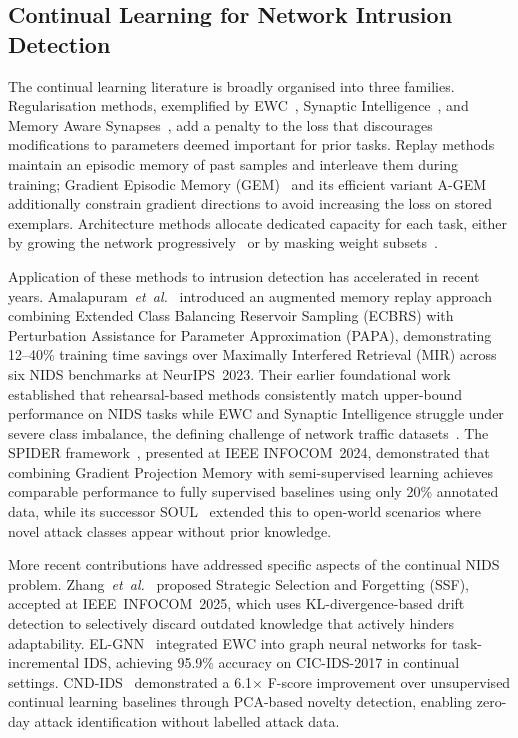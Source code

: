 \documentclass[journal]{IEEEtran}
\theoremstyle{definition}
\theoremstyle{remark}
\begin{document}
\subsection{Continual Learning for Network Intrusion Detection}
\label{subsec:cl_related}

The continual learning literature is broadly organised into three families. Regularisation methods, exemplified by EWC~\cite{kirkpatrick2017ewc}, Synaptic Intelligence~\cite{zenke2017continual}, and Memory Aware Synapses~\cite{aljundi2018memory}, add a penalty to the loss that discourages modifications to parameters deemed important for prior tasks. Replay methods maintain an episodic memory of past samples and interleave them during training; Gradient Episodic Memory (GEM)~\cite{lopezpaz2017gem} and its efficient variant A-GEM~\cite{chaudhry2019agem} additionally constrain gradient directions to avoid increasing the loss on stored exemplars. Architecture methods allocate dedicated capacity for each task, either by growing the network progressively~\cite{rusu2016progressive} or by masking weight subsets~\cite{serra2018overcoming}.

Application of these methods to intrusion detection has accelerated in recent years. Amalapuram~\textit{et~al.}~\cite{amalapuram2023augmented} introduced an augmented memory replay approach combining Extended Class Balancing Reservoir Sampling (ECBRS) with Perturbation Assistance for Parameter Approximation (PAPA), demonstrating 12--40\% training time savings over Maximally Interfered Retrieval (MIR) across six NIDS benchmarks at NeurIPS~2023. Their earlier foundational work established that rehearsal-based methods consistently match upper-bound performance on NIDS tasks while EWC and Synaptic Intelligence struggle under severe class imbalance, the defining challenge of network traffic datasets~\cite{amalapuram2022comsnets}. The SPIDER framework~\cite{amalapuram2024spider}, presented at IEEE INFOCOM~2024, demonstrated that combining Gradient Projection Memory with semi-supervised learning achieves comparable performance to fully supervised baselines using only 20\% annotated data, while its successor SOUL~\cite{amalapuram2024soul} extended this to open-world scenarios where novel attack classes appear without prior knowledge.

More recent contributions have addressed specific aspects of the continual NIDS problem. Zhang~\textit{et~al.}~\cite{zhang2025ssf} proposed Strategic Selection and Forgetting (SSF), accepted at IEEE~INFOCOM~2025, which uses KL-divergence-based drift detection to selectively discard outdated knowledge that actively hinders adaptability. EL-GNN~\cite{elgnn2025} integrated EWC into graph neural networks for task-incremental IDS, achieving 95.9\% accuracy on CIC-IDS-2017 in continual settings. CND-IDS~\cite{cndids2025} demonstrated a 6.1$\times$ F-score improvement over unsupervised continual learning baselines through PCA-based novelty detection, enabling zero-day attack identification without labelled attack data.
\end{document}
